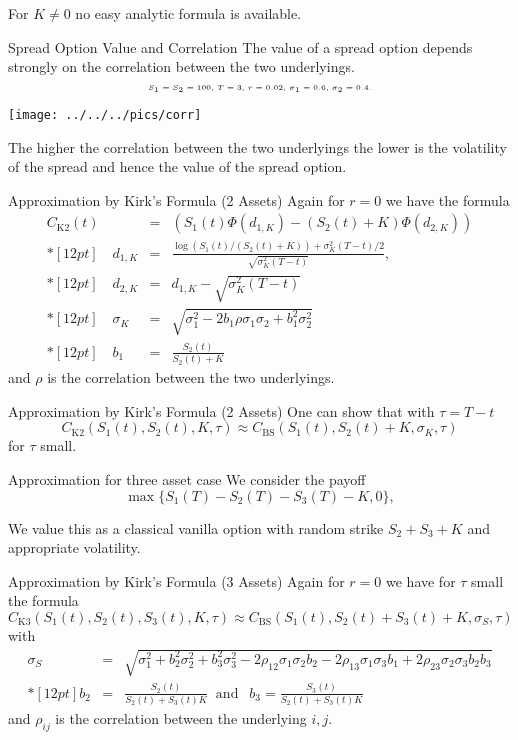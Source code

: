 	For $K\neq 0$ no easy analytic formula is available.


Spread Option Value and Correlation 
	The value of a spread option depends strongly on the correlation between the two underlyings. 
	$$\tiny\text{$S_1=S_2=100$, $T=3$, $r=0.02$, $\sigma_1=0.6$, $\sigma_2=0.4$.}$$

	\texttt{[image: ../../../pics/corr]}

	The higher the correlation between the two underlyings the lower is
	the volatility of the spread and hence the value of the spread option. 


Approximation by Kirk's Formula (2 Assets)
	Again for $r=0$ we have the formula $$\begin{array}{lll}
	 C_{\mbox{K2}}(t) & = & (S_1(t)\Phi(d_{1,K})-(S_2(t)+K)\Phi(d_{2,K}))
	 \\*[12pt]
	 \quad d_{1,K} & = & \frac{\log(S_1(t)/(S_2(t)+K))+\sigma_K^{2}(T-t)/2}{\sqrt{\sigma_K^{2}(T-t)}},\\*[12pt] 
		\quad d_{2,K} &=&d_{1,K}-\sqrt{\sigma_K^{2}(T-t)}
	 \\*[12pt]
	 \quad \sigma_K & = & \sqrt{\sigma_1^2-2b_1\rho\sigma_1\sigma_2+b_1^2\sigma_2^2}\\*[12pt]
	 \quad b_1 &=& \frac{S_2(t)}{S_2(t)+K}
	\end{array}$$
	and $\rho$ is the correlation between the two underlyings.


Approximation by Kirk's Formula (2 Assets)
	One can show that with $\tau=T-t$ 
	$$
	 C_{\mbox{K2}}(S_1(t), S_2(t), K, \tau) \approx
	 C_{\mbox{BS}}(S_1(t), S_2(t)+K, \sigma_K, \tau)
	 $$
	for  $\tau$ small. 


Approximation for three asset case 
	We consider the payoff 
	\begin{equation}
	\max\{S_{1}(T)-S_{2}(T)-S_{3}(T)-K,0\},\label{Three_asset_value}
	\end{equation}

	We value this as a classical vanilla option with random strike $S_{2}+S_{3}+K$
	and appropriate volatility. 


Approximation by Kirk's Formula (3 Assets)
	Again for $r=0$ we have for  $\tau$ small the formula 
	{\small
	\begin{equation}
	 C_{\mbox{K3}}(S_1(t), S_2(t), S_3(t), K, \tau) \approx
	 C_{\mbox{BS}}(S_1(t), S_2(t)+S_3(t)+K, \sigma_S, \tau)
	\label{kirk3}
	\end{equation}
	with
	 $$
	 \begin{array}{lll}
	 \sigma_S & = & \sqrt{\sigma_1^2+b_2^2\sigma_2^2 +b_3^2\sigma_3^2
	 - 2\rho_{12}\sigma_1\sigma_2b_2 - 2\rho_{13}\sigma_1\sigma_3b_1 + 2\rho_{23}\sigma_2\sigma_3b_2b_3}\\*[12pt]
	 b_2 &=& \frac{S_2(t)}{S_2(t)+S_3(t) K}
	 \;\;\mbox{and}  \;\;\
		b_3 = \frac{S_3(t)}{S_2(t)+S_3(t) K}
	\end{array}$$
	}
	and $\rho_{ij}$ is the correlation between the underlying $i,j$.


